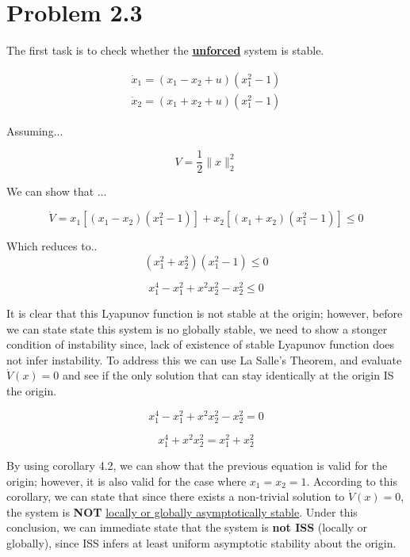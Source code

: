 \section*{Problem 2.3}


The first task is to check whether the \textbf{\underline{unforced}} system is stable.


$$
\begin{array}{l}
\dot{x}_{1}=\left(x_{1}-x_{2}+u\right)\left(x_{1}^{2}-1\right) \\
\dot{x}_{2}=\left(x_{1}+x_{2}+u\right)\left(x_{1}^{2}-1\right)
\end{array}
$$


\noindent Assuming...

$$
V=\frac{1}{2}\|x\|_{2}^{2}
$$



\noindent We can show that ...

$$
\dot{V}=x_{1}\left[\left(x_{1}-x_{2}\right)\left(x_{1}^{2}-1\right)\right]+x_{2}\left[\left(x_{1}+x_{2}\right)\left(x_{1}^{2}-1\right)\right] \leqslant 0
$$

\noindent Which reduces to..
$$
\left(x_{1}^{2}+x_{2}^{2}\right)\left(x_{1}^{2}-1\right) \leq 0
$$

$$
x_{1}^{4}-x_{1}^{2}+x^{2} x_{2}^{2}-x_{2}^{2} \leq 0
$$

\noindent It is clear that this Lyapunov function is not stable at the origin; however, before we can state state this system is no globally stable, we need to show a stonger condition of instability since, lack of existence of stable Lyapunov function does not infer instability. To address this we can use La Salle's Theorem, and evaluate $\dot{V}(x)=0$ and see if the only solution that can stay identically at the origin IS the origin.


$$
x_{1}^{4}-x_{1}^{2}+x^{2} x_{2}^{2}-x_{2}^{2} = 0
$$

$$
x_{1}^{4}+x^{2} x_{2}^{2} = x_{1}^{2} + x_{2}^{2}
$$


\noindent By using corollary 4.2, we can show that the previous equation is valid for the origin; however, it is also valid for the case where $x_1=x_2=1$. According to this corollary, we can state that since there exists a non-trivial solution to $\dot{V}(x)=0$, the system is \textbf{NOT} \underline{locally or globally asymptotically stable}.  Under this conclusion, we can immediate state that the system is \textbf{not ISS} (locally or globally), since ISS infers at least uniform asymptotic stability about the origin.  
